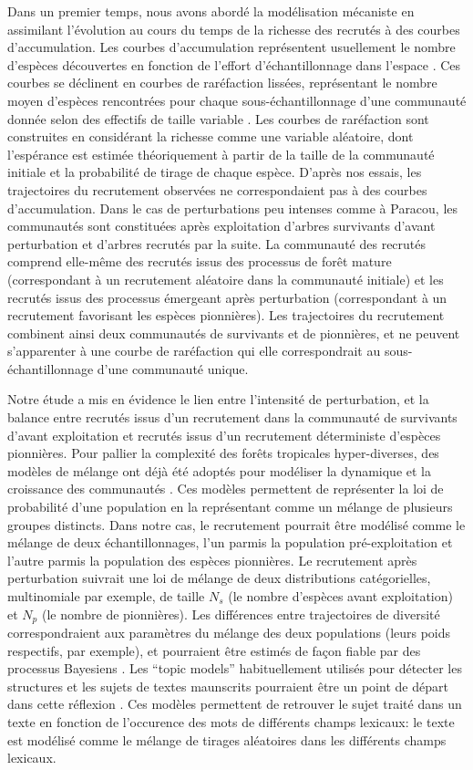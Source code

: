 \documentclass[
  11pt,
  french,
  A4paper,
  extrafontsizes,onecolumn,openright
  ]{memoir}
\begin{document}
Dans un premier temps, nous avons abordé la modélisation mécaniste en
assimilant l'évolution au cours du temps de la richesse des recrutés à
des courbes d'accumulation. Les courbes d'accumulation représentent
usuellement le nombre d'espèces découvertes en fonction de l'effort
d'échantillonnage dans l'espace \autocite{Gotelli2001}. Ces courbes se
déclinent en courbes de raréfaction lissées, représentant le nombre
moyen d'espèces rencontrées pour chaque sous-échantillonnage d'une
communauté donnée selon des effectifs de taille variable
\autocite{Ugland2003}. Les courbes de raréfaction sont construites en
considérant la richesse comme une variable aléatoire, dont l'espérance
est estimée théoriquement à partir de la taille de la communauté
initiale et la probabilité de tirage de chaque espèce. D'après nos
essais, les trajectoires du recrutement observées ne correspondaient pas
à des courbes d'accumulation. Dans le cas de perturbations peu intenses
comme à Paracou, les communautés sont constituées après exploitation
d'arbres survivants d'avant perturbation et d'arbres recrutés par la
suite. La communauté des recrutés comprend elle-même des recrutés issus
des processus de forêt mature (correspondant à un recrutement aléatoire
dans la communauté initiale) et les recrutés issus des processus
émergeant après perturbation (correspondant à un recrutement favorisant
les espèces pionnières). Les trajectoires du recrutement combinent ainsi
deux communautés de survivants et de pionnières, et ne peuvent
s'apparenter à une courbe de raréfaction qui elle correspondrait au
sous-échantillonnage d'une communauté unique.

Notre étude a mis en évidence le lien entre l'intensité de perturbation,
et la balance entre recrutés issus d'un recrutement dans la communauté
de survivants d'avant exploitation et recrutés issus d'un recrutement
déterministe d'espèces pionnières. Pour pallier la complexité des forêts
tropicales hyper-diverses, des modèles de mélange ont déjà été adoptés
pour modéliser la dynamique et la croissance des communautés
\autocite{Mortier2013}. Ces modèles permettent de représenter la loi de
probabilité d'une population en la représentant comme un mélange de
plusieurs groupes distincts. Dans notre cas, le recrutement pourrait
être modélisé comme le mélange de deux échantillonnages, l'un parmis la
population pré-exploitation et l'autre parmis la population des espèces
pionnières. Le recrutement après perturbation suivrait une loi de
mélange de deux distributions catégorielles, multinomiale par exemple,
de taille \(N_s\) (le nombre d'espèces avant exploitation) et \(N_p\)
(le nombre de pionnières). Les différences entre trajectoires de
diversité correspondraient aux paramètres du mélange des deux
populations (leurs poids respectifs, par exemple), et pourraient être
estimés de façon fiable par des processus Bayesiens
\autocite{Mortier2013}. Les ``topic models'' habituellement utilisés
pour détecter les structures et les sujets de textes maunscrits
pourraient être un point de départ dans cette réflexion
\autocites{Mclachlan2000}{Blei2012}. Ces modèles permettent de retrouver
le sujet traité dans un texte en fonction de l'occurence des mots de
différents champs lexicaux: le texte est modélisé comme le mélange de
tirages aléatoires dans les différents champs lexicaux.
\end{document}
